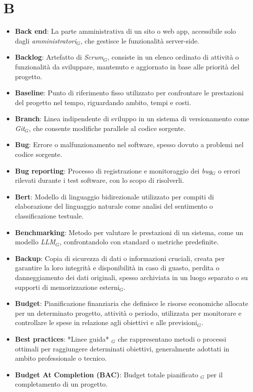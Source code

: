 \section{B}
\begin{itemize}
    \item \textbf{Back end}: La parte amministrativa di un sito o web app, accessibile solo dagli \textit{amministratori}$_G$, che gestisce le funzionalità server-side.
    \item \textbf{Backlog}: Artefatto di \textit{Scrum}$_G$, consiste in un elenco ordinato di attività o funzionalità da sviluppare, mantenuto e aggiornato in base alle priorità del progetto.
    \item \textbf{Baseline}: Punto di riferimento fisso utilizzato per confrontare le prestazioni del progetto nel tempo, riguardando ambito, tempi e costi.
    \item \textbf{Branch}: Linea indipendente di sviluppo in un sistema di versionamento come \textit{Git}$_G$, che consente modifiche parallele al codice sorgente.
    \item \textbf{Bug}: Errore o malfunzionamento nel software, spesso dovuto a problemi nel codice sorgente.
    \item \textbf{Bug reporting}: Processo di registrazione e monitoraggio dei \textit{bug}$_G$ o errori rilevati durante i test software, con lo scopo di risolverli.
    \item \textbf{Bert}: Modello di linguaggio bidirezionale utilizzato per compiti di elaborazione del linguaggio naturale come analisi del sentimento o classificazione testuale.
    \item \textbf{Benchmarking}: Metodo per valutare le prestazioni di un sistema, come un modello \textit{LLM}$_G$, confrontandolo con standard o metriche predefinite.
    \item \textbf{Backup}: Copia di sicurezza di dati o informazioni cruciali, creata per garantire la loro integrità e disponibilità in caso di guasto, perdita o danneggiamento dei dati originali, spesso archiviata in un luogo separato o su supporti di memorizzazione esterni$_G$.
    \item \textbf{Budget}: Pianificazione finanziaria che definisce le risorse economiche allocate per un determinato progetto, attività o periodo, utilizzata per monitorare e controllare le spese in relazione agli obiettivi e alle previsioni$_G$.
    \item \textbf{Best practices}: *Linee guida* $_G$ che rappresentano metodi o processi ottimali per raggiungere determinati obiettivi, generalmente adottati in ambito professionale o tecnico.
    \item \textbf{Budget At Completion (BAC)}: Budget totale pianificato $_G$ per il completamento di un progetto.
\end{itemize}
